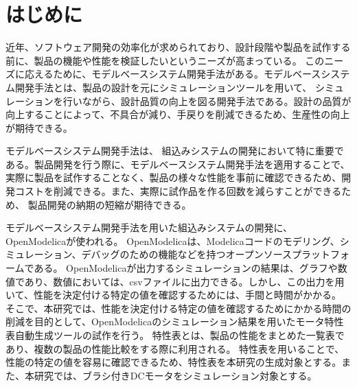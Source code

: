 \chapter{はじめに}\label{cha:Introduction}
近年、ソフトウェア開発の効率化が求められており、設計段階や製品を試作する前に、製品の機能や性能を検証したいというニーズが高まっている\cite{modelicaモデルベース本}。
このニーズに応えるために、モデルベースシステム開発手法がある\cite{modelicaモデルベース本}。モデルベースシステム開発手法とは、製品の設計を元にシミュレーションツールを用いて、
シミュレーションを行いながら、設計品質の向上を図る開発手法である\cite{ipa_2016}。設計の品質が向上することによって、不具合が減り、手戻りを削減できるため、生産性の向上が期待できる\cite{ipa_2016}。

モデルベースシステム開発手法は、 組込みシステムの開発において特に重要である\cite{ipa_useful_modelbase_dev}。製品開発を行う際に、モデルベースシステム開発手法を適用することで、
実際に製品を試作することなく、製品の様々な性能を事前に確認できるため、開発コストを削減できる\cite{modelicaモデルベース本}。また、実際に試作品を作る回数を減らすことができるため、
製品開発の納期の短縮が期待できる。

モデルベースシステム開発手法を用いた組込みシステムの開発に、OpenModelica\cite{open_modelica}が使われる。
OpenModelicaは、Modelica\cite{modelicaモデルベース本}コードのモデリング、シミュレーション、デバッグのための機能などを持つオープンソースプラットフォームである。
OpenModelicaが出力するシミュレーションの結果は、グラフや数値であり、数値においては、csvファイルに出力できる。しかし、この出力を用いて、性能を決定付ける特定の値を確認するためには、手間と時間がかかる。
そこで、本研究では、性能を決定付ける特定の値を確認するためにかかる時間の削減を目的として、OpenModelicaのシミュレーション結果を用いたモータ特性表自動生成ツールの試作を行う。
特性表とは、製品の性能をまとめた一覧表であり、複数の製品の性能比較をする際に利用される\cite{特性表1,特性表2,特性表3,特性表4,特性表5,特性表6,特性表7,特性表8,特性表9,特性表10}。
特性表を用いることで、性能の特定の値を容易に確認できるため、特性表を本研究の生成対象とする。また、本研究では、ブラシ付きDCモータ\cite{モータ使う}をシミュレーション対象とする。



